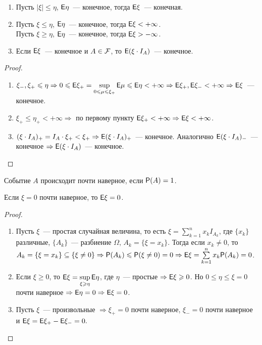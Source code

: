 \begin{property}
	\begin{enumerate}
		\item Пусть $|\xi| \leqslant \eta$, $\E\eta$~--- конечное, тогда $\E \xi$~--- конечная.
		\item Пусть $\xi \leqslant \eta$, $\E\eta$~--- конечное, тогда $\E\xi < + \infty$. \\
		Пусть $\xi \geqslant \eta$, $\E\eta$~--- конечное, тогда $\E\xi > - \infty$.
		\item Если $\E\xi$~--- конечное и $A \in \F$, то $\E(\xi\cdot I_A)$~--- конечное.
	\end{enumerate}
	\begin{proof}
		\begin{enumerate}
			\item $\xi_-, \xi_+ \leqslant \eta \Rightarrow 0 \leqslant \E\xi_+ = \sup\limits_{0 \leqslant \mu \leqslant \xi_+}\E\mu \leqslant \E\eta < +\infty \Rightarrow \E\xi_+, \E\xi_- < +\infty \Rightarrow \E\xi$~--- конечное.
			\item $\xi_+ \leqslant \eta_+ < +\infty \Rightarrow$ по первому пункту $\E\xi_+ < +\infty \Rightarrow \E\xi < +\infty$.
			\item $(\xi\cdot I_A)_+ = I_A\cdot\xi_+ < \xi_+ \Rightarrow \E(\xi\cdot I_A)_+$~--- конечное. Аналогично $\E(\xi\cdot I_A)_-$~--- конечное $\Rightarrow \E(\xi\cdot I_A)$~--- конечное.
		\end{enumerate}
	\end{proof}
\end{property}

\begin{definition}
	Событие $A$ происходит почти наверное, если $\P(A) = 1$.
\end{definition}

\begin{property}
	Если $\xi = 0$ почти наверное, то $\E\xi = 0$.
	\begin{proof}
	    \begin{enumerate}
	    \item Пусть $\xi$~--- простая случайная величина, то есть $\xi = \sum\limits_{k = 1}^nx_kI_{A_k}$, где $\{x_k\}$ различные, $\{A_k\}$~--- разбиение $\Omega$, $A_k = \{\xi = x_k\}$. Тогда если $x_k \neq 0$, то $A_k = \{\xi = x_k\} \subseteq \{\xi \neq 0\} \Rightarrow \P(A_k) \leqslant \P(\xi \neq 0) = 0 \Rightarrow \E\xi = \sum\limits_{k = 1}^n x_k\P(A_k) = 0$. 
	    
	    \item Если $\xi \geqslant 0$, то $\E\xi = \sup\limits_{\xi \geqslant \eta} \E\eta$, где $\eta$~--- простые $\Rightarrow \E\xi \geqslant 0$. Но $0 \leqslant \eta \leqslant \xi = 0$ почти наверное $\Rightarrow \E\eta = 0 \Rightarrow \E\xi = 0$. 
	    
	    \item Пусть $\xi$~--- произвольные $\Rightarrow \xi_+ = 0$ почти наверное, $\xi_- = 0$ почти наверное и $\E\xi = \E\xi_+ - \E\xi_- = 0.$
	    \end{enumerate}
	\end{proof} 
\end{property}


